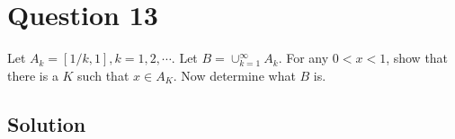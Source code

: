\section*{Question 13}

Let \( A_{k}=[1 / k, 1], k=1,2, \cdots \).
Let \( B=\cup_{k=1}^{\infty} A_{k} \).
For any \(0<x<1\), show that there is a \(K\) such that \(x \in A_{K}\).
Now determine what \(B\) is.

\subsection*{Solution}
